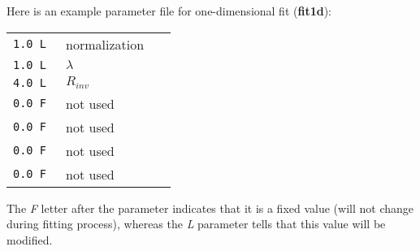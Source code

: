       Here is an example parameter file for one-dimensional fit (\textbf{fit1d}):
      \begin{longtable}{p{0.2\linewidth}p{0.2\linewidth}}
        \verb|1.0 L|   & normalization\\
        \verb|1.0 L|   & $\lambda$\\
        \verb|4.0 L|   & $R_{inv}$\\
        \verb|0.0 F|   & not used \\
        \verb|0.0 F|   & not used \\
        \verb|0.0 F|   & not used \\
        \verb|0.0 F|   & not used \\
      \end{longtable}
      The \textit{F} letter after the parameter indicates that it is a fixed value (will not change during fitting process), whereas the \textit{L} parameter tells that this value will be modified.


